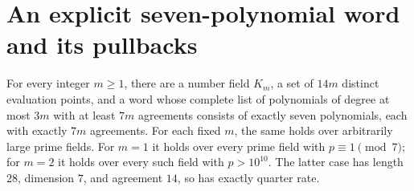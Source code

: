 \section{An explicit seven-polynomial word and its pullbacks}
\label{app:seven-cubic-bank}

\begin{theorem}\label{thm:seven-cubic-bank}
For every integer $m\geq1$, there are a number field $K_m$, a set of
$14m$ distinct evaluation points, and a word whose complete list of
polynomials of degree at most $3m$ with at least $7m$ agreements consists
of exactly seven polynomials, each with exactly $7m$ agreements.
For each fixed $m$, the same holds over arbitrarily large prime fields.
For $m=1$ it holds over every prime field with $p\equiv1\pmod7$;
for $m=2$ it holds over every such field with $p>10^{10}$.
The latter case has length $28$, dimension $7$, and agreement $14$,
so has exactly quarter rate.
\end{theorem}

